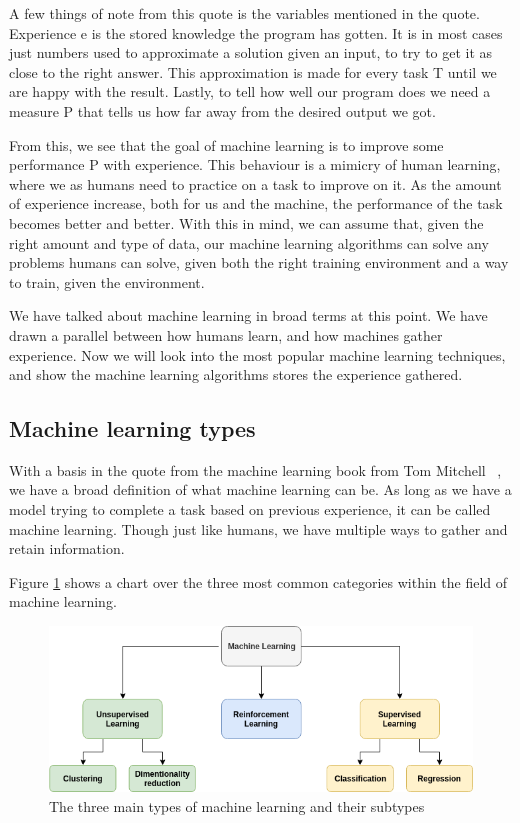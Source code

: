 \vspace{10px}
A few things of note from this quote is the variables mentioned in the quote. Experience e is the stored knowledge the program has gotten. It is in most cases just numbers used to approximate a solution given an input, to try to get it as close to the right answer. This approximation is made for every task T until we are happy with the result.
Lastly, to tell how well our program does we need a measure P that tells us how far away from the desired output we got.
   
From this, we see that the goal of machine learning is to improve some performance P with experience. This behaviour is a mimicry of human learning, where we as humans need to practice on a task to improve on it.
As the amount of experience increase, both for us and the machine, the performance of the task becomes better and better. With this in mind, we can assume that, given the right amount and type of data, our machine learning algorithms can solve any problems humans can solve, given both the right training environment and a way to train, given the environment.

We have talked about machine learning in broad terms at this point. We have drawn a parallel between how humans learn, and how machines gather experience.  Now we will look into the most popular machine learning techniques, and show the machine learning algorithms stores the experience gathered.
 
\subsection{Machine learning types}
With a basis in the quote from the machine learning book from Tom Mitchell~\cite{MitchellTomM1997Ml} , we have a broad definition of what machine learning can be.
As long as we have a model trying to complete a task based on previous experience, it can be called machine learning. Though just like humans, we have multiple ways to gather and retain information.

Figure \ref{fig:ML_types} shows a chart over the three most common categories within the field of machine learning. 

    \begin{figure}[h]
        \centering
        \includegraphics[scale=0.6]{background/figures/ML_types.png}
        \caption{The three main types of machine learning and their subtypes}
    \label{fig:ML_types} 
    \end{figure}

